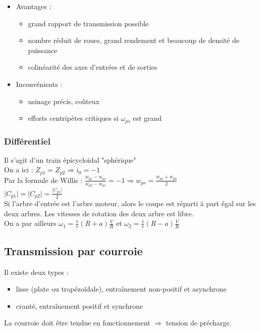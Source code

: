 \documentclass[../main.tex]{subfiles}
\begin{document}
\begin{itemize}
    \item Avantages : \begin{itemize}
        \item grand rapport de transmission possible\\
        \item nombre réduit de roues, grand rendement et beaucoup de densité de puissance\\
        \item colinéarité des axes d'entrées et de sorties\\
    \end{itemize}
    \item Inconvénients : \begin{itemize}
        \item usinage précis, coûteux\\
        \item efforts centripètes critiques si $\omega_{ps}$ est grand\\
    \end{itemize}
\end{itemize}

\subsubsection{Différentiel}
Il s'agit d'un train épicycloïdal "sphérique"\\
On a ici : $Z_{p1} = Z_{p2} \Rightarrow i_0 = -1$\\
Par la formule de Willis : $ \frac{w_{p1}-w_{ps}}{w_{p2}-w_{ps}} = -1 \Rightarrow w_{ps} = \frac{w_{p1}+w_{p2}}{2}$\\
$\lvert C_{p1}\rvert = \lvert C_{p2} \rvert = \frac{\lvert C_{ps}\rvert}{2}$\\

Si l'arbre d'entrée est l'arbre moteur, alors le coupe est réparti à part égal sur les deux arbres. Les vitesses de rotation des deux arbre est libre.\\
On a par ailleurs $\omega_1 = \frac{1}{r} (R+a)\frac{V}{R}$ et $\omega_2 = \frac{1}{r}(R-a) \frac{V}{R}$\\


\subsection{Transmission par courroie}
Il existe deux types : \begin{itemize}
    \item lisse (plate ou trapézoïdale), entraînement non-positif et asynchrone\\
    \item cranté, entraînement positif et synchrone\\
\end{itemize}
La courroie doit être tendue en fonctionnement $\Rightarrow$ tension de précharge.\\
\end{document}
